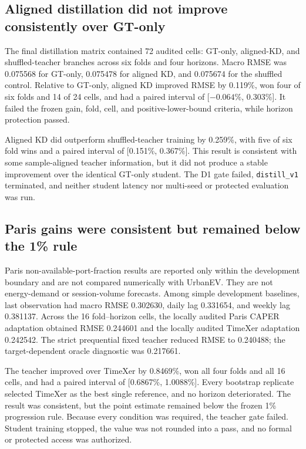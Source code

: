 \subsection{Aligned distillation did not improve consistently over GT-only}
\label{sec:results-distillation}

The final distillation matrix contained 72 audited cells: GT-only, aligned-KD, and shuffled-teacher branches across six folds and four horizons.  Macro RMSE was 0.075568 for GT-only, 0.075478 for aligned KD, and 0.075674 for the shuffled control.  Relative to GT-only, aligned KD improved RMSE by 0.119\%, won four of six folds and 14 of 24 cells, and had a paired interval of [$-0.064\%$, 0.303\%].  It failed the frozen gain, fold, cell, and positive-lower-bound criteria, while horizon protection passed.

Aligned KD did outperform shuffled-teacher training by 0.259\%, with five of six fold wins and a paired interval of [0.151\%, 0.367\%].  This result is consistent with some sample-aligned teacher information, but it did not produce a stable improvement over the identical GT-only student.  The D1 gate failed, \texttt{distill\_v1} terminated, and neither student latency nor multi-seed or protected evaluation was run.

\subsection{Paris gains were consistent but remained below the 1\% rule}
\label{sec:results-paris}

Paris non-available-port-fraction results are reported only within the development boundary and are not compared numerically with UrbanEV.  They are not energy-demand or session-volume forecasts.  Among simple development baselines, last observation had macro RMSE 0.302630, daily lag 0.331654, and weekly lag 0.381137.  Across the 16 fold--horizon cells, the locally audited Paris CAPER adaptation obtained RMSE 0.244601 and the locally audited TimeXer adaptation 0.242542.  The strict prequential fixed teacher reduced RMSE to 0.240488; the target-dependent oracle diagnostic was 0.217661.

The teacher improved over TimeXer by 0.8469\%, won all four folds and all 16 cells, and had a paired interval of [0.6867\%, 1.0088\%].  Every bootstrap replicate selected TimeXer as the best single reference, and no horizon deteriorated.  The result was consistent, but the point estimate remained below the frozen 1\% progression rule.  Because every condition was required, the teacher gate failed.  Student training stopped, the value was not rounded into a pass, and no formal or protected access was authorized.

